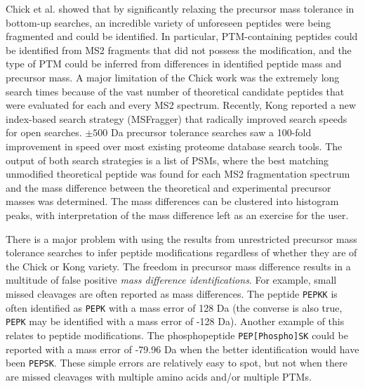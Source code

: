 \documentclass[journal=jprobs,manuscript=article]{achemso}
\begin{document}
Chick et al. showed that by significantly relaxing the precursor mass tolerance in bottom-up searches, an incredible variety of unforeseen peptides were being fragmented and could be identified\citep{Chick_2015}.
In particular, PTM-containing peptides could be identified from MS2 fragments that did not possess the modification, and the type of PTM could be inferred from differences in identified peptide mass and precursor mass.
A major limitation of the Chick work was the extremely long search times because of the vast number of theoretical candidate peptides that were evaluated for each and every MS2 spectrum.
Recently, Kong\citep{Kong_2017} reported a new index-based search strategy (MSFragger) that radically improved search speeds for open searches.
$\pm 500$ Da precursor tolerance searches saw a 100-fold improvement in speed over most existing proteome database search tools.
The output of both search strategies is a list of PSMs, where the best matching unmodified theoretical peptide was found for each MS2 fragmentation spectrum and the mass difference between the theoretical and experimental precursor masses was determined.
The mass differences can be clustered into histogram peaks\citep{Rodriguez_2014}, with interpretation of the mass difference left as an exercise for the user.

There is a major problem with using the results from unrestricted precursor mass tolerance searches to infer peptide modifications regardless of whether they are of the Chick or Kong variety.
The freedom in precursor mass difference results in a multitude of false positive \textit{mass difference identifications}.
For example, small missed cleavages are often reported as mass differences.
The peptide \texttt{PEPKK} is often identified as \texttt{PEPK} with a mass error of 128 Da (the converse is also true, \texttt{PEPK} may be identified with a mass error of -128 Da).
Another example of this relates to peptide modifications.
The phosphopeptide \texttt{PEP[Phospho]SK} could be reported with a mass error of -79.96 Da when the better identification would have been \texttt{PEPSK}.
These simple errors are relatively easy to spot, but not when there are missed cleavages with multiple amino acids and/or multiple PTMs.
\end{document}
